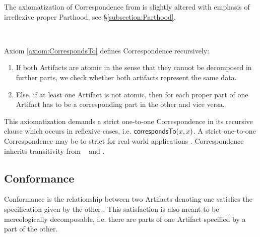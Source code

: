 The axiomatization of \gls{Correspondence} from \cite{DBLP:conf/modelsward/HeinzLV17} is slightly altered with emphasis of irreflexive proper \gls{Parthood}, see §\ref{subsection:Parthood}.
\begin{axiom}[\correspondsTo]
\label{axiom:CorrespondsTo}
~\newline
{}
\end{axiom}
Axiom \ref{axiom:CorrespondsTo} defines \gls{Correspondence} recursively:
\begin{enumerate}[align=left,label=\textbf{Case \Roman*},ref={\Roman*}]
\item
If both \glspl{Artifact} are atomic in the sense that they cannot be decomposed in further parts, we check whether both artifacts represent the same data.

\item
Else, if at least one \gls{Artifact} is not atomic, then for each proper part of one \gls{Artifact} has to be a corresponding part in the other and vice versa.
\end{enumerate}
This axiomatization demands a strict one-to-one \gls{Correspondence} in its recursive clause which occurs in reflexive cases, i.e. $\textsf{correspondsTo}(x,x)$.
A strict one-to-one \gls{Correspondence} may be to strict for real-world applications \cite{DBLP:conf/sle/Lammel16}.
\Gls{Correspondence} inherits transitivity from \represents~ and \properPartOf.

\subsection{Conformance}
\label{subsection:Conformance}
\Gls{Conformance} is the relationship between two \glspl{Artifact} denoting one satisfies the specification given by the other \cite{DBLP:conf/modelsward/HeinzLV17}.
This satisfaction is also meant to be mereologically decomposable, i.e. there are parts of one \gls{Artifact} specified by a part of the other.


